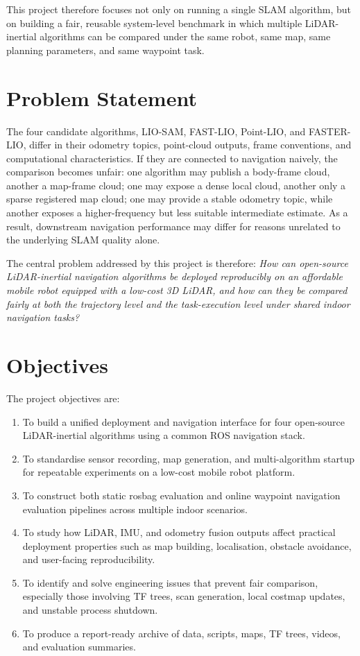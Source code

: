 \documentclass[12pt,a4paper]{report}
\begin{document}
This project therefore focuses not only on running a single SLAM algorithm, but on building a fair, reusable system-level benchmark in which multiple LiDAR-inertial algorithms can be compared under the same robot, same map, same planning parameters, and same waypoint task.

\section{Problem Statement}
The four candidate algorithms, LIO-SAM, FAST-LIO, Point-LIO, and FASTER-LIO, differ in their odometry topics, point-cloud outputs, frame conventions, and computational characteristics. If they are connected to navigation naively, the comparison becomes unfair: one algorithm may publish a body-frame cloud, another a map-frame cloud; one may expose a dense local cloud, another only a sparse registered map cloud; one may provide a stable odometry topic, while another exposes a higher-frequency but less suitable intermediate estimate. As a result, downstream navigation performance may differ for reasons unrelated to the underlying SLAM quality alone.

The central problem addressed by this project is therefore: \emph{How can open-source LiDAR-inertial navigation algorithms be deployed reproducibly on an affordable mobile robot equipped with a low-cost 3D LiDAR, and how can they be compared fairly at both the trajectory level and the task-execution level under shared indoor navigation tasks?}

\section{Objectives}
The project objectives are:
\begin{enumerate}[leftmargin=2em]
    \item To build a unified deployment and navigation interface for four open-source LiDAR-inertial algorithms using a common ROS navigation stack.
    \item To standardise sensor recording, map generation, and multi-algorithm startup for repeatable experiments on a low-cost mobile robot platform.
    \item To construct both static rosbag evaluation and online waypoint navigation evaluation pipelines across multiple indoor scenarios.
    \item To study how LiDAR, IMU, and odometry fusion outputs affect practical deployment properties such as map building, localisation, obstacle avoidance, and user-facing reproducibility.
    \item To identify and solve engineering issues that prevent fair comparison, especially those involving TF trees, scan generation, local costmap updates, and unstable process shutdown.
    \item To produce a report-ready archive of data, scripts, maps, TF trees, videos, and evaluation summaries.
\end{enumerate}
\end{document}
